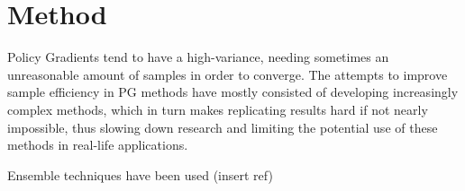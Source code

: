 \section{Method}

Policy Gradients tend to have a high-variance, needing sometimes an unreasonable amount of samples in order to converge. The attempts to improve sample efficiency in PG methods have mostly consisted of developing increasingly complex methods, which in turn makes replicating results hard if not nearly impossible, thus slowing down research and limiting the potential use of these methods in real-life applications.

Ensemble techniques have been used (insert ref)
